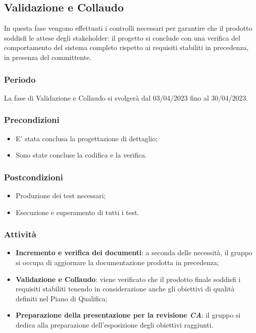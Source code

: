 \subsection{Validazione e Collaudo}
In questa fase vengono effettuati i controlli necessari per garantire che il prodotto soddisfi le attese degli stakeholder: il progetto si conclude con una verifica del comportamento del sistema completo rispetto ai requisiti stabiliti in precedenza, in presenza del committente.

\subsubsection{Periodo}
La fase di Validazione e Collaudo si svolgerà dal 03/04/2023 fino al 30/04/2023.

\subsubsection{Precondizioni}
\begin{itemize}
    \item E’ stata conclusa la progettazione di dettaglio;
    \item Sono state concluse la codifica e la verifica.
\end{itemize}

\subsubsection{Postcondizioni}
\begin{itemize}
    \item Produzione dei test necessari;
    \item Esecuzione e superamento di tutti i test.
\end{itemize}

\subsubsection{Attività}
\begin{itemize}
    \item \textbf{Incremento e verifica dei documenti}: a seconda delle necessità, il gruppo si occupa di aggiornare la documentazione prodotta in precedenza;
    \item \textbf{Validazione e Collaudo}: viene verificato che il prodotto finale soddisfi i requisiti stabiliti tenendo in considerazione anche gli obiettivi di qualità definiti nel Piano di Qualifica;
    \item \textbf{Preparazione della presentazione per la revisione \textit{CA}}: il gruppo si dedica alla preparazione dell’esposizione degli obiettivi raggiunti.
\end{itemize}

